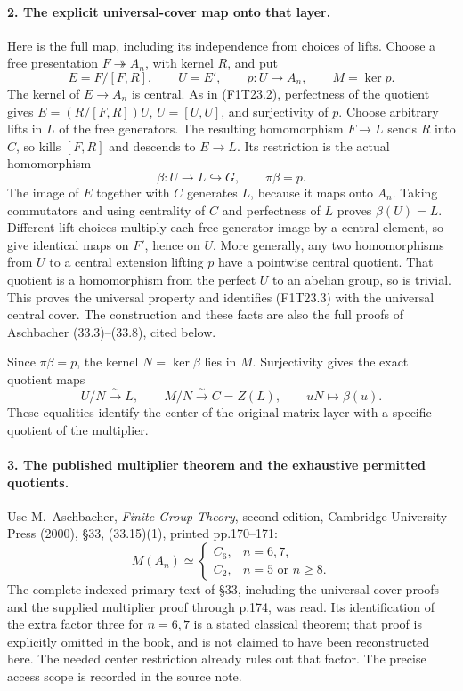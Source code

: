 \paragraph{2. The explicit universal-cover map onto that layer.}
Here is the full map, including its independence from
choices of lifts. Choose a free presentation
\(F\twoheadrightarrow A_n\), with kernel \(R\),
and put
\[
 E=F/[F,R],\qquad U=E',\qquad
 p:U\longrightarrow A_n,\qquad M=\ker p.
 \tag{F1T23.3}
\]
The kernel of \(E\to A_n\) is central.
As in (F1T23.2), perfectness of the quotient gives
\(E=(R/[F,R])U\), \(U=[U,U]\), and surjectivity
of \(p\). Choose arbitrary lifts in \(L\) of the
free generators. The resulting homomorphism
\(F\to L\) sends \(R\) into \(C\), so kills
\([F,R]\) and descends to \(E\to L\).
Its restriction is the actual homomorphism
\[
 \beta:U\longrightarrow L\hookrightarrow G,
       \qquad\pi\beta=p.
 \tag{F1T23.4}
\]
The image of \(E\) together with \(C\) generates
\(L\), because it maps onto \(A_n\). Taking
commutators and using centrality of \(C\) and
perfectness of \(L\) proves
\(\beta(U)=L\). Different lift choices multiply
each free-generator image by a central element, so
give identical maps on \(F'\), hence on \(U\).
More generally, any two homomorphisms from \(U\)
to a central extension lifting \(p\) have a pointwise
central quotient. That quotient is a homomorphism
from the perfect \(U\) to an abelian group, so is
trivial. This proves the universal property and
identifies (F1T23.3) with the universal central cover.
The construction and these facts are also the full
proofs of Aschbacher (33.3)--(33.8), cited below.

Since \(\pi\beta=p\), the kernel
\(N=\ker\beta\) lies in \(M\). Surjectivity
gives the exact quotient maps
\[
       U/N\xrightarrow{\sim}L,\qquad
       M/N\xrightarrow{\sim}C=Z(L),
       \qquad uN\longmapsto\beta(u).
 \tag{F1T23.5}
\]
These equalities identify the center of the original
matrix layer with a specific quotient of the multiplier.

\paragraph{3. The published multiplier theorem and the exhaustive permitted quotients.}
Use M.~Aschbacher, \emph{Finite Group Theory},
second edition, Cambridge University Press (2000),
\S33, (33.15)(1), printed pp.170--171:
\[
 M(A_n)\simeq
 \begin{cases}
 C_6,&n=6,7,\\
 C_2,&n=5\text{ or }n\ge8.
 \end{cases}
 \tag{F1T23.6}
\]
The complete indexed primary text of \S33,
including the universal-cover proofs and the supplied
multiplier proof through p.174, was read. Its
identification of the extra factor three for \(n=6,7\)
is a stated classical theorem; that proof is explicitly
omitted in the book, and is not claimed to have been
reconstructed here. The needed center restriction
already rules out that factor. The precise access
scope is recorded in the source note.

